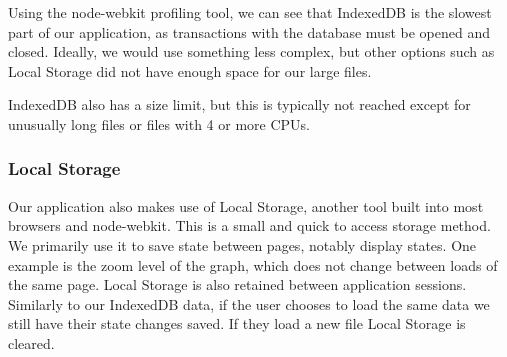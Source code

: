\documentclass{hmcclinic}
\begin{document}
  Using the node-webkit profiling tool, we can see that IndexedDB is the slowest
  part of our application, as transactions with the database must be opened and
  closed. Ideally, we would use something less complex, but other options such
  as Local Storage did not have enough space for our large files.

  IndexedDB also has  a size limit, but this is typically not reached except for
  unusually long files or files with 4 or more CPUs.

  \subsubsection{Local Storage}

  Our application also makes use of Local Storage, another tool
  built into most browsers and node-webkit. This is a small and quick to access
  storage method. We primarily use it to save state between pages, notably
  display states. One example is the zoom level of the graph, which does not
  change between loads of the same page. Local Storage is also retained between
  application sessions. Similarly to our IndexedDB data, if the user chooses to
  load the same data we still have their state changes saved. If they load a new
  file Local Storage is cleared.
\end{document}
